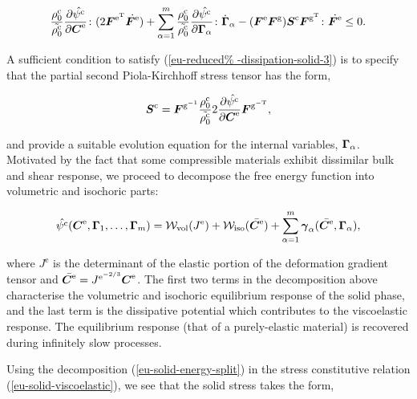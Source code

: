 \begin{equation}
\frac{\rho_{0}^{\mathrm{c}}}{\tilde{\rho_{0}^{\mathrm{c}}}}
\frac{\partial \hat{\psi^{\mathrm{c}}}}{\partial \mbox{\boldmath$ C$}^{\mathrm{e}}}
\colon (2 \mbox{\boldmath$ F$}^{\mathrm{e}^{\mathrm{T}}} \dot{\mbox{\boldmath$ F$}^{\mathrm{e}}}) +
\sum_{\alpha=1}^{m}
\frac{\rho_{0}^{\mathrm{c}}}{\tilde{\rho_{0}^{\mathrm{c}}}}
\frac{\partial \hat{\psi^{\mathrm{c}}}}{\partial \mbox{\boldmath$\Gamma$}_{\alpha}}
\colon \dot{\mbox{\boldmath$\Gamma$}}_{\alpha} - (\mbox{\boldmath$ F$}^{\mathrm{e}}\mbox{\boldmath$ F$}^{\mathrm{g}})
\mbox{\boldmath$ S$}^{\mathrm{c}} \mbox{\boldmath$ F$}^{\mathrm{g}^{\mathrm{T}}} \colon
\dot{\mbox{\boldmath$ F$}^{\mathrm{e}}} \leq 0.
\label{eu-reduced-dissipation-solid-3}
\end{equation}

\noindent A sufficient condition to satisfy (\ref{eu-reduced%
  -dissipation-solid-3}) is to specify that the partial second
Piola-Kirchhoff stress tensor has the form,

\begin{equation}
\mbox{\boldmath$ S$}^{\mathrm{c}} = \mbox{\boldmath$ F$}^{\mathrm{g}^{\mathrm{-1}}}
\frac{\rho_{0}^{\mathrm{c}}}{\tilde{\rho_{0}^{\mathrm{c}}}} 2
\frac{\partial \hat{\psi^{\mathrm{c}}}}{\partial \mbox{\boldmath$ C$}^{\mathrm{e}}}
\mbox{\boldmath$ F$}^{\mathrm{g}^{\mathrm{-T}}},
\label{eu-solid-viscoelastic}
\end{equation}

\noindent and provide a suitable evolution equation for the internal
variables, $\mbox{\boldmath$\Gamma$}_{\alpha}$. Motivated by the fact that some
compressible materials exhibit dissimilar bulk and shear response, we
proceed to decompose the free energy function into volumetric and
isochoric parts:

\begin{equation}
\hat{\psi^{\mathrm{c}}} (\mbox{\boldmath$ C$}^{\mathrm{e}}, \mbox{\boldmath$\Gamma$}_{1}, \ldots,
\mbox{\boldmath$\Gamma$}_{m}) = {\mathcal W}_{\mathrm{vol}}(J^{\mathrm{e}}) +
{\mathcal W}_{\mathrm{iso}}(\bar{\mbox{\boldmath$ C$}^{\mathrm{e}}}) +
\sum_{\alpha=1}^{m}\mbox{\boldmath$\gamma$}_{\alpha}
(\bar{\mbox{\boldmath$ C$}^{\mathrm{e}}},\mbox{\boldmath$\Gamma$}_{\alpha}),
\label{eu-solid-energy-split}
\end{equation}

\noindent where $J^{\mathrm{e}}$ is the determinant of the elastic
portion of the deformation gradient tensor and
$\bar{\mbox{\boldmath$ C$}^{\mathrm{e}}}=J^{\mathrm{e}^{-2/3}}\mbox{\boldmath$ C$}^{\mathrm{e}}$. The
first two terms in the decomposition above characterise the volumetric
and isochoric equilibrium response of the solid phase, and the last
term is the dissipative potential which contributes to the
viscoelastic response. The equilibrium response (that of a
purely-elastic material) is recovered during infinitely slow
processes.

Using the decomposition (\ref{eu-solid-energy-split}) in the stress
constitutive relation (\ref{eu-solid-viscoelastic}), we see that the
solid stress takes the form,

